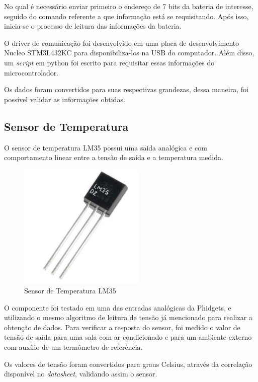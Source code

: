 		No qual é necessário enviar primeiro o endereço de 7 bits da bateria de interesse, seguido do comando referente a que informação está se requisitando. Após isso, inicia-se o processo de leitura das informações da bateria.
		
		O driver de comunicação foi desenvolvido em uma placa de desenvolvimento Nucleo STM3L432KC para disponibiliza-los na USB do computador. Além disso, um \textit{script} em python foi escrito para requisitar essas informações do microcontrolador.
	    
	    Os dados foram convertidos para suas respectivas grandezas, dessa maneira, foi possível validar as informações obtidas.
    
    \subsection{Sensor de Temperatura}
    
	    O sensor de temperatura LM35 possui uma saída analógica e com comportamento linear entre a tensão de saída e a temperatura medida.
	    
	    \begin{figure}[!ht]
			   \centering
			   \includegraphics[width=6cm]{Figures/lm35.jpg}
			   \caption{Sensor de Temperatura LM35}
			   \label{fig:LM35}
		\end{figure}
	   
	    O componente foi testado em uma das entradas analógicas da Phidgets, e utilizando o mesmo algoritmo de leitura de tensão já mencionado para realizar a obtenção de dados. Para verificar a resposta do sensor, foi medido o valor de tensão de saída para uma sala com ar-condicionado e para um ambiente externo com auxílio de um termômetro de referência.
	    
	    Os valores de tensão foram convertidos para graus Celsius, através da correlação disponível no \textit{datasheet}, validando assim o sensor.
    
